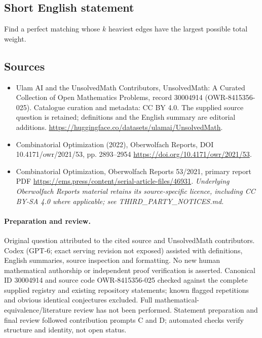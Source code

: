 \documentclass[11pt]{article}
\begin{document}
\subsection{Short English statement}
Find a perfect matching whose $k$ heaviest edges have the largest possible total weight.
\subsection{Sources}
\begin{itemize}
\item[\hypertarget{source:30004914:1}{S1}] Ulam AI and the UnsolvedMath Contributors, UnsolvedMath: A Curated Collection of Open Mathematics Problems, record 30004914 (OWR-8415356-025). Catalogue curation and metadata: CC BY 4.0. The supplied source question is retained; definitions and the English summary are editorial additions.
\url{https://huggingface.co/datasets/ulamai/UnsolvedMath}.
\item[\hypertarget{source:30004914:2}{S2}] Combinatorial Optimization (2022), Oberwolfach Reports, DOI 10.4171/owr/2021/53, pp. 2893--2954
\url{https://doi.org/10.4171/owr/2021/53}.
\item[\hypertarget{source:30004914:3}{S3}] Combinatorial Optimization, Oberwolfach Reports 53/2021, primary report PDF
\url{https://ems.press/content/serial-article-files/46931}.
\textit{Underlying Oberwolfach Reports material retains its source-specific licence, including CC BY-SA 4.0 where applicable; see THIRD\_PARTY\_NOTICES.md.}
\end{itemize}
\paragraph{Preparation and review.}
Original question attributed to the cited source and UnsolvedMath contributors. Codex (GPT-6; exact serving revision not exposed) assisted with definitions, English summaries, source inspection and formatting. No new human mathematical authorship or independent proof verification is asserted. Canonical ID 30004914 and source code OWR-8415356-025 checked against the complete supplied registry and existing repository statements; known flagged repetitions and obvious identical conjectures excluded. Full mathematical-equivalence/literature review has not been performed. Statement preparation and final review followed contribution prompts C and D; automated checks verify structure and identity, not open status.
\label{end:30004914}
\end{document}
